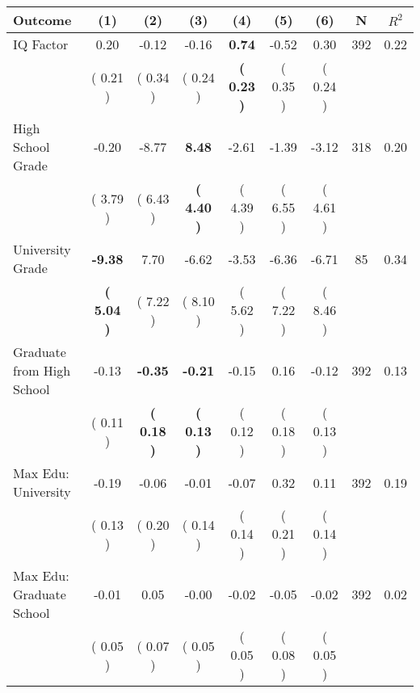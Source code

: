 \begin{tabular}{lcccccccc}
\toprule
 \textbf{Outcome} & \textbf{(1)} & \textbf{(2)} & \textbf{(3)} & \textbf{(4)} & \textbf{(5)} & \textbf{(6)} & \textbf{N} & \textbf{$ R^2$} \\
\midrule
IQ Factor &      0.20 &     -0.12 &     -0.16 & \textbf{     0.74} &     -0.52 &      0.30 & 392 &       0.22 \\ 
 & (     0.21 ) & (     0.34 ) & (     0.24 ) & \textbf{(     0.23 )} & (     0.35 ) & (     0.24 ) & \\
High School Grade &     -0.20 &     -8.77 & \textbf{     8.48} &     -2.61 &     -1.39 &     -3.12 & 318 &       0.20 \\ 
 & (     3.79 ) & (     6.43 ) & \textbf{(     4.40 )} & (     4.39 ) & (     6.55 ) & (     4.61 ) & \\
University Grade & \textbf{    -9.38} &      7.70 &     -6.62 &     -3.53 &     -6.36 &     -6.71 & 85 &       0.34 \\ 
 & \textbf{(     5.04 )} & (     7.22 ) & (     8.10 ) & (     5.62 ) & (     7.22 ) & (     8.46 ) & \\
Graduate from High School &     -0.13 & \textbf{    -0.35} & \textbf{    -0.21} &     -0.15 &      0.16 &     -0.12 & 392 &       0.13 \\ 
 & (     0.11 ) & \textbf{(     0.18 )} & \textbf{(     0.13 )} & (     0.12 ) & (     0.18 ) & (     0.13 ) & \\
Max Edu: University &     -0.19 &     -0.06 &     -0.01 &     -0.07 &      0.32 &      0.11 & 392 &       0.19 \\ 
 & (     0.13 ) & (     0.20 ) & (     0.14 ) & (     0.14 ) & (     0.21 ) & (     0.14 ) & \\
Max Edu: Graduate School &     -0.01 &      0.05 &     -0.00 &     -0.02 &     -0.05 &     -0.02 & 392 &       0.02 \\ 
 & (     0.05 ) & (     0.07 ) & (     0.05 ) & (     0.05 ) & (     0.08 ) & (     0.05 ) & \\
\bottomrule
\end{tabular}
